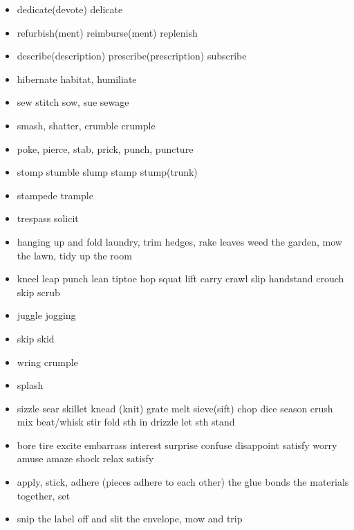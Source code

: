 \documentclass[a4paper,11pt,twoside]{book}
\begin{document}
\begin{itemize}
	\item dedicate(devote) delicate
	
	\item refurbish(ment) reimburse(ment) replenish
	
	\item describe(description) prescribe(prescription) subscribe
	
	\item hibernate habitat, humiliate
	
	\item sew stitch sow,  sue sewage
	
	\item smash, shatter, crumble crumple
	
	\item poke, pierce, stab, prick, punch, puncture
	
	\item stomp stumble slump stamp stump(trunk) 
	
	\item stampede trample 
	
	\item trespass solicit
	
	\item hanging up and fold laundry, trim hedges, rake leaves weed the garden, mow the lawn,  tidy up the room
	
	\item kneel leap punch lean tiptoe hop squat lift carry crawl slip handstand crouch skip scrub 
	
	\item juggle jogging
	
	\item skip skid
	
	\item wring crumple
	
	\item splash 
	
	\item sizzle sear skillet knead (knit) grate melt sieve(sift) chop dice season crush mix beat/whisk stir fold sth in drizzle let sth stand
	
	\item bore tire excite embarrass interest surprise confuse disappoint satisfy worry amuse amaze shock relax satisfy
	
	\item apply, stick,  adhere (pieces adhere to each other) the glue bonds the materials together,   set
	
	\item snip the label off and slit the envelope, mow and trip 
	
\end{itemize}
\end{document}
